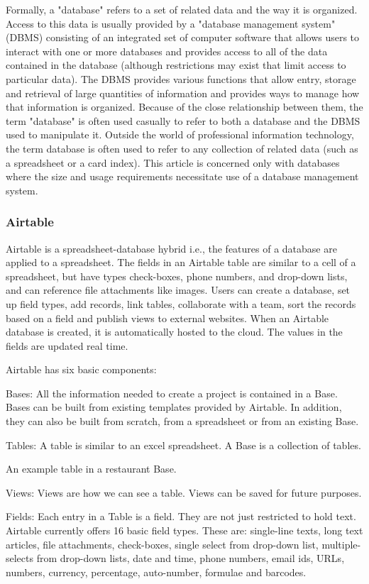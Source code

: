 	Formally, a "database" refers to a set of related data and the way it is organized. Access to this data is usually provided by a "database management system" (DBMS) consisting of an integrated set of computer software that allows users to interact with one or more databases and provides access to all of the data contained in the database (although restrictions may exist that limit access to particular data). The DBMS provides various functions that allow entry, storage and retrieval of large quantities of information and provides ways to manage how that information is organized.
Because of the close relationship between them, the term "database" is often used casually to refer to both a database and the DBMS used to manipulate it.
Outside the world of professional information technology, the term database is often used to refer to any collection of related data (such as a spreadsheet or a card index). This article is concerned only with databases where the size and usage requirements necessitate use of a database management system.

\subsubsection{Airtable}
	Airtable is a spreadsheet-database hybrid i.e., the features of a database are applied to a spreadsheet. The fields in an Airtable table are similar to a cell of a spreadsheet, but have types check-boxes, phone numbers, and drop-down lists, and can reference file attachments like images.
Users can create a database, set up field types, add records, link tables, collaborate with a team, sort the records based on a field and publish views to external websites. When an Airtable database is created, it is automatically hosted to the cloud. The values in the fields are updated real time.

	Airtable has six basic components:

Bases: All the information needed to create a project is contained in a Base. Bases can be built from existing templates provided by Airtable. In addition, they can also be built from scratch, from a spreadsheet or from an existing Base.

Tables: A table is similar to an excel spreadsheet. A Base is a collection of tables.

An example table in a restaurant Base.

Views: Views are how we can see a table. Views can be saved for future purposes.

Fields: Each entry in a Table is a field. They are not just restricted to hold text. Airtable currently offers 16 basic field types. These are: single-line texts, long text articles, file attachments, check-boxes, single select from drop-down list, multiple-selects from drop-down lists, date and time, phone numbers, email ids, URLs, numbers, currency, percentage, auto-number, formulae and barcodes.

